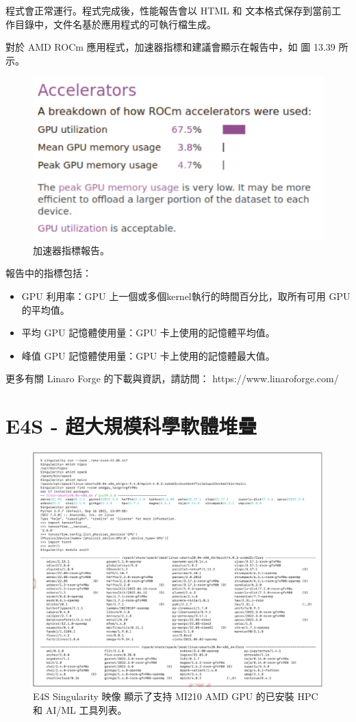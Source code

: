 程式會正常運行。程式完成後，性能報告會以 HTML 和 文本格式保存到當前工作目錄中，文件名基於應用程式的可執行檔生成。

對於 AMD ROCm 應用程式，加速器指標和建議會顯示在報告中，如 圖 13.39 所示。

\begin{figure}
    \centering
    \includegraphics[width=0.9\linewidth]{FileAusiliari/Screenshots/Figure13-39.png}
    \caption{加速器指標報告。}
    \label{fig:PAPI39}
\end{figure}

報告中的指標包括：
\begin{itemize}
    \item GPU 利用率：GPU 上一個或多個kernel執行的時間百分比，取所有可用 GPU 的平均值。
    \item 平均 GPU 記憶體使用量：GPU 卡上使用的記憶體平均值。
    \item 峰值 GPU 記憶體使用量：GPU 卡上使用的記憶體最大值。
\end{itemize}

更多有關 Linaro Forge 的下載與資訊，請訪問：
https://www.linaroforge.com/


\section{E4S - 超大規模科學軟體堆疊}

\begin{figure}
    \centering
    \includegraphics[width=0.9\linewidth]{FileAusiliari/Screenshots/Figure13-40.png}
    \caption{E4S Singularity 映像 顯示了支持 MI210 AMD GPU 的已安裝 HPC 和 AI/ML 工具列表。}
    \label{fig:PAPI40}
\end{figure}


